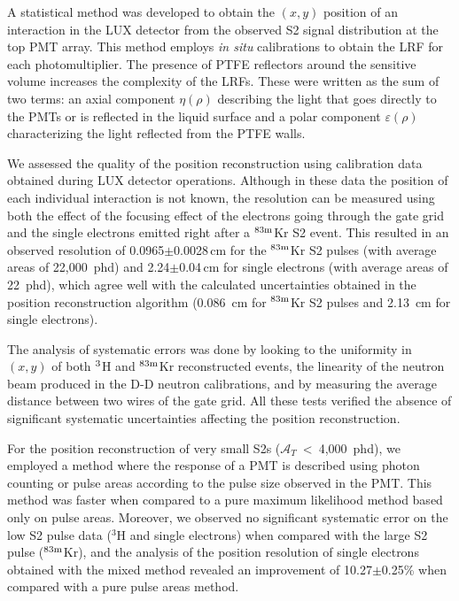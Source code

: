 \documentclass[a4paper,11pt]{article}
\begin{document}
A statistical method was developed to obtain the $(x, y)$ position of an interaction in the LUX detector from the observed S2 signal distribution at the top PMT array. This method employs \emph{in situ} calibrations to obtain the LRF for each photomultiplier. The presence of PTFE reflectors around the sensitive volume increases the complexity of the LRFs. These were written as the sum of two terms: an axial component $\eta\left(\rho\right)$ describing the light that goes directly to the PMTs or is reflected in the liquid surface and a polar component $\varepsilon\left(\rho\right)$ characterizing the light reflected from the PTFE walls. 

We assessed the quality of the position reconstruction using calibration data obtained during LUX detector operations. Although in these data the position of each individual interaction is not known, the resolution can be measured using both the effect of the focusing effect of the electrons going through the gate grid and the single electrons emitted right after a ${}^{{\rm 83m}}$Kr S2 event. This resulted in an observed resolution of 0.0965$\pm$0.0028\,cm for the ${}^{{\rm 83m}}$Kr S2 pulses (with average areas of 22,000~phd) and 2.24$\pm$0.04\,cm for single electrons (with average areas of 22~phd), which agree well with the calculated uncertainties obtained in the position reconstruction algorithm (0.086~cm for ${}^{{\rm 83m}}$Kr S2 pulses and 2.13~cm for single electrons). 

The analysis of systematic errors was done by looking to the uniformity in $(x, y)$ of both ${}^{{\rm 3}}$H and ${}^{{\rm 83m}}$Kr reconstructed events, the linearity of the neutron beam produced in the D-D neutron calibrations, and by measuring the average distance between two wires of the gate grid. All these tests verified the absence of  significant systematic uncertainties affecting the position reconstruction.

For the position reconstruction of very small S2s ($\mathcal{A}_T$~<~4,000~phd), we employed a method where the response of a PMT is described using photon counting or pulse areas according to the pulse size observed in the PMT. This method was  faster when compared to a pure maximum likelihood method based only on pulse areas. Moreover, we observed no significant systematic error on the low S2 pulse data (${}^{3}$H and single electrons) when compared with the large S2 pulse (${}^{{\rm 83m}}$Kr), and the analysis of the position resolution of single electrons obtained with the mixed method revealed an improvement of 10.27$\pm$0.25\% when compared with a pure pulse areas method. 
\end{document}

